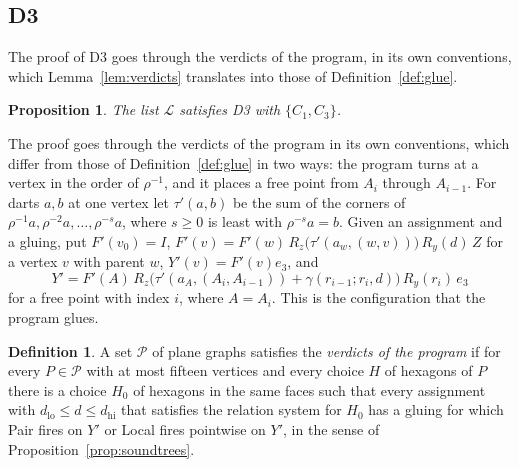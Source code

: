 \documentclass[12pt]{amsart}
\newtheorem{proposition}[theorem]{Proposition}
\theoremstyle{definition}
\newtheorem{definition}[theorem]{Definition}
\theoremstyle{plain}
\theoremstyle{definition}
\newcommand{\dlo}{d_{\mathrm{lo}}}
\newcommand{\dhi}{d_{\mathrm{hi}}}
\newcommand{\CI}{C_1}
\newcommand{\CIII}{C_3}
\newcommand{\leanmap}[1]{\ignorespaces}
\newcommand{\codemap}[1]{\ignorespaces}
\newcommand{\mapnote}[1]{\ignorespaces}
\begin{document}
\subsection{D3}\label{sec:dthreeproof}
The proof of D3 goes through the verdicts of the program, in its own conventions, which Lemma~\ref{lem:verdicts} translates into those of Definition~\ref{def:glue}.

\begin{proposition}\label{prop:dthree}\mapnote{not formalized; D3 is a hypothesis of Theorem \ref{thm:formal}; Lemma \ref{lem:verdicts}, Proposition \ref{prop:sound} and Theorem \ref{thm:trees} are the formal steps of its proof, and \texttt{Tammes15.Contractors.killed\_of\_progTreesDom} is D3 from the hypotheses of Theorem \ref{thm:trees}}\codemap{code/impl1/coverage_join.sh > code/impl1/out/guarded/coverage_join.txt, code/impl1/replay_summary.sh > code/impl1/out/guarded/replay_summary.txt}
The list $\mathcal L$ satisfies D3 with $\{\CI,\CIII\}$.
\end{proposition}

The proof goes through the verdicts of the program in its own conventions, which differ from those of Definition~\ref{def:glue} in two ways: the program turns at a vertex in the order of $\rho^{-1}$, and it places a free point from $A_i$ through $A_{i-1}$. For darts $a,b$ at one vertex let $\tau'(a,b)$ be the sum of the corners of $\rho^{-1}a,\rho^{-2}a,\dots,\rho^{-s}a$, where $s\ge0$ is least with $\rho^{-s}a=b$. Given an assignment and a gluing, put $F'(v_0)=I$, $F'(v)=F'(w)\,R_z\bigl(\tau'(a_w,(w,v))\bigr)\,R_y(d)\,Z$ for a vertex $v$ with parent $w$, $Y'(v)=F'(v)e_3$, and
\[
Y'=F'(A)\,R_z\bigl(\tau'(a_A,(A_i,A_{i-1}))+\gamma(r_{i-1};r_i,d)\bigr)\,R_y(r_i)\,e_3
\]
for a free point with index $i$, where $A=A_i$. This is the configuration that the program glues.

\begin{definition}\label{def:verdicts}\leanmap{Tammes15.PaperSteps.ProgKilled, Tammes15.PaperSteps.SameHexSet, Tammes15.PaperSteps.turnR, Tammes15.PaperSteps.progFrameN, Tammes15.PaperSteps.progGlueY, Tammes15.PaperSteps.tieNormalize, Tammes15.PaperSteps.InTieBoxes, Tammes15.PaperSteps.TieFires, Tammes15.PaperSteps.tieMid, Tammes15.PaperSteps.tieRad, Tammes15.PaperSteps.tieContacts}
A set $\mathcal P$ of plane graphs satisfies the \emph{verdicts of the program} if for every $P\in \mathcal P$ with at most fifteen vertices and every choice $H$ of hexagons of $P$ there is a choice $H_0$ of hexagons in the same faces such that every assignment with $\dlo\le d\le\dhi$ that satisfies the relation system for $H_0$ has a gluing for which Pair fires on $Y'$ or Local fires pointwise on $Y'$, in the sense of Proposition~\ref{prop:soundtrees}.
\end{definition}
\end{document}
